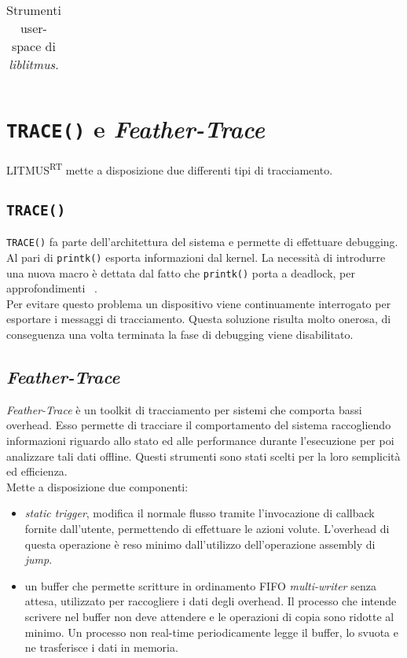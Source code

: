 \begin{appendices}
\begin{table}
\begin{tabular}{|l p{10cm}|}
  	\hline
  	\end{tabular}
  \caption{Strumenti user-space di \textit{liblitmus}.}
  \label{tab:liblitmus_functions}
\end{table}

\chapter{\texttt{TRACE()} e \textit{Feather-Trace}}
\label{sec:trace}

LITMUS\textsuperscript{RT} mette a disposizione due differenti tipi di tracciamento.\\

\section{\texttt{TRACE()}}

\texttt{TRACE()} fa parte dell'architettura del sistema e permette di effettuare debugging. Al pari di \texttt{printk()} esporta informazioni dal kernel. La necessità di introdurre una nuova macro è dettata dal fatto che \texttt{printk()} porta a deadlock, per approfondimenti ~\cite{BBBThesis}.\\

Per evitare questo problema un dispositivo viene continuamente interrogato per esportare i messaggi di tracciamento. Questa soluzione risulta molto onerosa, di conseguenza una volta terminata la fase di debugging viene disabilitato.\\

\section{\textit{Feather-Trace}}

\textit{Feather-Trace} è un toolkit di tracciamento per sistemi che comporta bassi overhead. Esso permette di tracciare il comportamento del sistema raccogliendo informazioni riguardo allo stato ed alle performance durante l'esecuzione per poi analizzare tali dati offline. Questi strumenti sono stati scelti per la loro semplicità ed efficienza.\\

Mette a disposizione due componenti:\\

\begin{itemize}
	\item \textit{static trigger}, modifica il normale flusso tramite l'invocazione di callback fornite dall'utente, permettendo di effettuare le azioni volute. L'overhead di questa operazione è reso minimo dall'utilizzo dell'operazione assembly di \textit{jump}.
	\item un buffer che permette scritture in ordinamento FIFO \textit{multi-writer} senza attesa, utilizzato per raccogliere i dati degli overhead. Il processo che intende scrivere nel buffer non deve attendere e le operazioni di copia sono ridotte al minimo. Un processo non real-time periodicamente legge il buffer, lo svuota e ne trasferisce i dati in memoria.\\
\end{itemize}


\end{appendices}

